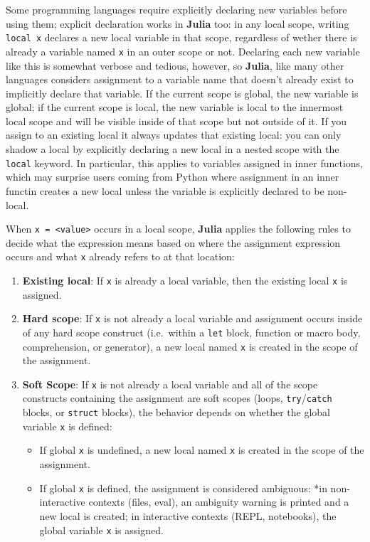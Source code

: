 \documentclass[
]{article}
\providecommand{\tightlist}{%
  \setlength{\itemsep}{0pt}\setlength{\parskip}{0pt}}
\begin{document}
Some programming languages require explicitly declaring new variables
before using them; explicit declaration works in \textbf{Julia} too: in
any local scope, writing \texttt{local\ x} declares a new local variable
in that scope, regardless of wether there is already a variable named
\texttt{x} in an outer scope or not. Declaring each new variable like
this is somewhat verbose and tedious, however, so \textbf{Julia}, like
many other languages considers assignment to a variable name that
doesn't already exist to implicitly declare that variable. If the
current scope is global, the new variable is global; if the current
scope is local, the new variable is local to the innermost local scope
and will be visible inside of that scope but not outside of it. If you
assign to an existing local it always updates that existing local: you
can only shadow a local by explicitly declaring a new local in a nested
scope with the \texttt{local} keyword. In particular, this applies to
variables assigned in inner functions, which may surprise users coming
from Python where assignment in an inner functin creates a new local
unless the variable is explicitly declared to be non-local.

When \texttt{x\ =\ \textless{}value\textgreater{}} occurs in a local
scope, \textbf{Julia} applies the following rules to decide what the
expression means based on where the assignment expression occurs and
what \texttt{x} already refers to at that location:

\begin{enumerate}
\def\labelenumi{\arabic{enumi}.}
\tightlist
\item
  \textbf{Existing local}: If \texttt{x} is already a local variable,
  then the existing local \texttt{x} is assigned.
\item
  \textbf{Hard scope}: If \texttt{x} is not already a local variable and
  assignment occurs inside of any hard scope construct (i.e.~within a
  \texttt{let} block, function or macro body, comprehension, or
  generator), a new local named \texttt{x} is created in the scope of
  the assignment.
\item
  \textbf{Soft Scope}: If \texttt{x} is not already a local variable and
  all of the scope constructs containing the assignment are soft scopes
  (loops, \texttt{try}/\texttt{catch} blocks, or \texttt{struct}
  blocks), the behavior depends on whether the global variable
  \texttt{x} is defined:

  \begin{itemize}
  \tightlist
  \item
    If global \texttt{x} is undefined, a new local named \texttt{x} is
    created in the scope of the assignment.
  \item
    If global \texttt{x} is defined, the assignment is considered
    ambiguous: *in non-interactive contexts (files, eval), an ambiguity
    warning is printed and a new local is created; in interactive
    contexts (REPL, notebooks), the global variable \texttt{x} is
    assigned.
  \end{itemize}
\end{enumerate}
\end{document}
